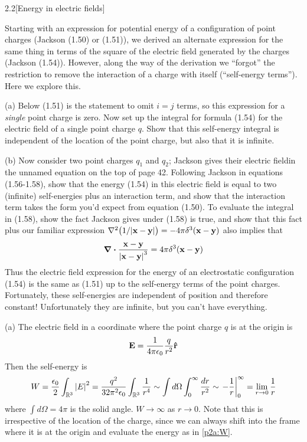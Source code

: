 \documentclass[12pt]{article}
\begin{document}
\begin{problem}{2.2}[Energy in electric fields]

Starting with an expression for potential energy of a configuration of point
charges (Jackson (1.50) or (1.51)), we derived an alternate expression for the
same thing in terms of the square of the electric field generated by the charges
(Jackson (1.54)). However, along the way of the derivation we ``forgot'' the
restriction to remove the interaction of a charge with itself (``self-energy
terms''). Here we explore this.

(a) Below (1.51) is the statement to omit $i=j$ terms, so this expression for a
\textit{single} point charge is zero. Now set up the integral for formula (1.54)
for the electric field of a single point charge $q$. Show that this self-energy
integral is independent of the location of the point charge, but also that it is
infinite.

(b) Now consider two point charges $q_1$ and $q_2$; Jackson gives their electric
fieldin the unnamed equation on the top of page 42. Following Jackson in
equations (1.56-1.58), show that the energy (1.54) in this electric field is
equal to two (infinite) self-energies plus an interaction term, and show that
the interaction term takes the form you'd expect from equation (1.50). To
evaluate the integral in (1.58), show the fact Jackson gives under (1.58) is
true, and show that this fact plus our familiar expression
$\laplacian\qty(1/\abs{\vb{x}-\vb{y}})=-4\pi\delta^3(\vb{x}-\vb{y})$ also
implies that
\begin{equation}
    \div{\frac{\vb{x}-\vb{y}}{\abs{\vb{x}-\vb{y}}^3}}
    =4\pi\delta^3(\vb{x}-\vb{y}) 
\end{equation}
Thus the electric field expression for the energy of an electrostatic
configuration (1.54) is the same as (1.51) up to the self-energy terms of the
point charges. Fortunately, these self-energies are independent of position and
therefore constant! Unfortunately they are infinite, but you can't have
everything.

\begin{solution}

(a) The electric field in a coordinate where the point charge $q$ is at the 
origin is
\begin{equation}
    \vb{E}=\frac1{4\pi\epsilon_0}\frac{q}{r^2}\vb{\hat{r}}
\end{equation}
Then the self-energy is
\begin{equation}\label{p2a:W}
    W=\frac{\epsilon_0}{2}\int_{\R^3}\abs{E}^2
    =\frac{q^2}{32\pi^2\epsilon_0}\int_{\R^3}\frac1{r^4}
    \sim\int d\Omega\int_0^\infty\frac{dr}{r^2}
    \sim\eval{-\frac1r}_0^\infty
    =\lim_{r\to0}\frac1r
\end{equation}
where $\int d\Omega=4\pi$ is the solid angle. $W\to\infty$ as $r\to0$. Note that
this is irrespective of the location of the charge, since we can always shift
into the frame where it is at the origin and evaluate the energy as in 
\eqref{p2a:W}.


\end{solution}
\end{problem}
\end{document}
